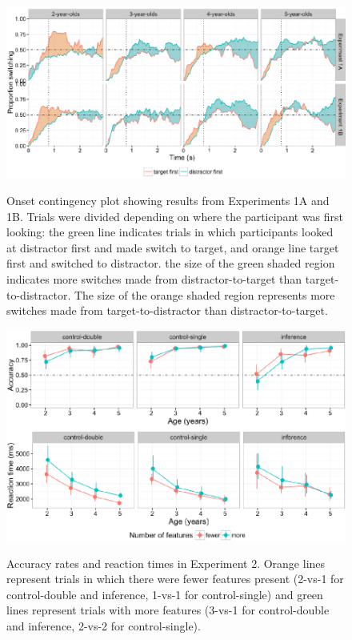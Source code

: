 \documentclass{rsos}
\begin{document}
\begin{figure}[!h]
{\centering \includegraphics[width=5.5in]{figs/et_onset1-1} 
}
\caption[Onset contingency plot showing results from Experiments 1A and 1B]{Onset contingency plot showing results from Experiments 1A and 1B. Trials were divided depending on where the participant was first looking: the green line indicates trials in which participants looked at distractor first and made switch to target, and orange line target first and switched to distractor. the size of the green shaded region indicates more switches made from distractor-to-target than target-to-distractor. The size of the orange shaded region represents more switches made from target-to-distractor than distractor-to-target.}\label{fig:et_onset1}
\end{figure}

\begin{figure}[!h]
{\centering \includegraphics[width=5.5in]{figs/ipaccrt-1} 
}
\caption[Accuracy rates and reaction times in Experiment 2]{Accuracy rates and reaction times in Experiment 2. Orange lines represent trials in which there were fewer features present (2-vs-1 for control-double and inference, 1-vs-1 for control-single) and green lines represent trials with more features (3-vs-1 for control-double and inference, 2-vs-2 for control-single).}\label{fig:ipaccrt}
\end{figure}
\end{document}

